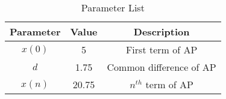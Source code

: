 \begin{table}[ht]
    \centering
    \begin{tabular}{|c|c|c|}
        \hline
        Parameter & Value & Description \\
        \hline
        $x(0)$ & 5 & First term of AP \\
        $d$ & 1.75 & Common difference of AP \\
        $x(n)$ & 20.75 & $n^{th}$ term of AP \\
        \hline
    \end{tabular}
    \vspace{2mm}
    \caption{Parameter List}
    \label{tab:simple.10.5.2.20}
\end{table}
